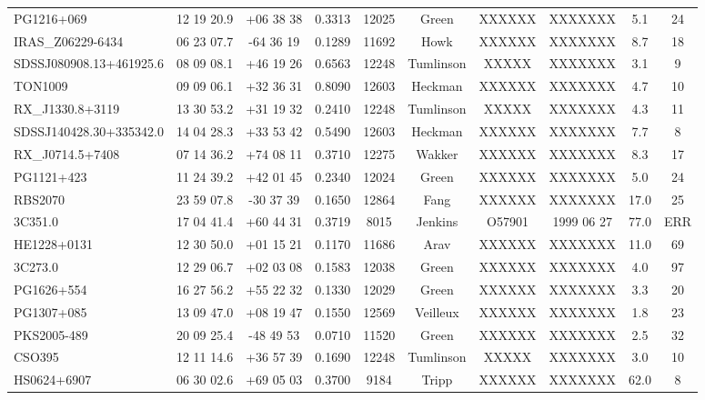 \documentclass[iop]{emulateapj-rtx4}
\begin{document}
\begin{table}[ht]
\begin{center}
\begin{tabular}{l c c c c c c c c c}
 PG1216+069				& 12 19 20.9  &  +06 38 38  &  0.3313 & 12025	 & Green	     & XXXXXX & XXXXXXX  &     5.1 &  24  \\
 IRAS\_Z06229-6434 		& 06 23 07.7  &  -64 36 19   &  0.1289 & 11692	 & Howk	     & XXXXXX & XXXXXXX  &     8.7 &  18  \\
 SDSSJ080908.13+461925.6 	& 08 09 08.1  &  +46 19 26  &  0.6563 & 12248	 & Tumlinson & XXXXX   & XXXXXXX  & 	  3.1 &  9  \\
 TON1009 				& 09 09 06.1  &  +32 36 31  &  0.8090 & 12603 & Heckman  & XXXXXX & XXXXXXX  &     4.7 &  10  \\
 RX\_J1330.8+3119 			& 13 30 53.2  &  +31 19 32  &  0.2410 & 12248	 & Tumlinson & XXXXX   & XXXXXXX  & 	  4.3 &  11  \\
 SDSSJ140428.30+335342.0 	& 14 04 28.3  &  +33 53 42 &  0.5490  & 12603	 & Heckman  & XXXXXX & XXXXXXX  &     7.7 &  8  \\
 RX\_J0714.5+7408 			& 07 14 36.2  &  +74 08 11  &  0.3710 & 12275 & Wakker      & XXXXXX & XXXXXXX  &     8.3 &  17  \\
 PG1121+423 				& 11 24 39.2  &  +42 01 45  &  0.2340 & 12024	 & Green	     & XXXXXX & XXXXXXX  &     5.0 & 24  \\
 RBS2070 				& 23 59 07.8  &  -30 37 39  &  0.1650  & 12864 & Fang	     & XXXXXX & XXXXXXX  &   17.0 &  25  \\
 3C351.0 					& 17 04 41.4  &  +60 44 31  &  0.3719 &  8015  & Jenkins      & O57901  & 1999 06 27 &  77.0 &  ERR  \\
 HE1228+0131 			& 12 30 50.0  &  +01 15 21  &  0.1170 & 11686 & Arav 	     & XXXXXX & XXXXXXX  &   11.0 &  69  \\
 3C273.0 					& 12 29 06.7  &  +02 03 08  &  0.1583 & 12038 & Green	     & XXXXXX & XXXXXXX  &     4.0 &  97  \\
 PG1626+554 				& 16 27 56.2  &  +55 22 32  &  0.1330 & 12029 & Green	     & XXXXXX & XXXXXXX  &     3.3 &  20  \\
 PG1307+085 				& 13 09 47.0  &  +08 19 47  &  0.1550 & 12569 & Veilleux     & XXXXXX & XXXXXXX  &     1.8 &  23  \\
 PKS2005-489 				& 20 09 25.4  &  -48 49 53   &  0.0710 & 11520 & Green 	     & XXXXXX & XXXXXXX  &     2.5 &  32  \\
 CSO395 					& 12 11 14.6  &  +36 57 39  &  0.1690 & 12248	 & Tumlinson & XXXXX   & XXXXXXX  & 	  3.0 &  10  \\
 HS0624+6907 			& 06 30 02.6  &  +69 05 03  &  0.3700 & 9184	 & Tripp 	     & XXXXXX & XXXXXXX  &   62.0 &  8  \\

\end{tabular}
\end{center}
\end{table}
\end{document}
